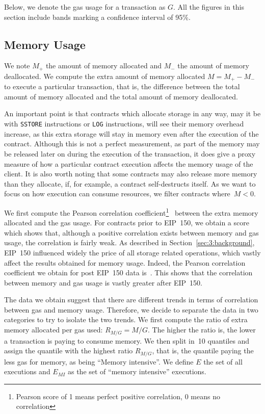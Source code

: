 Below, we denote the gas usage for a transaction as $G$. All the figures in this section include bands marking a confidence interval of 95\%.

\subsection{Memory Usage}
 We note $M_{+}$ the amount of memory allocated and $M_{-}$ the amount of memory deallocated. We compute the extra amount of memory allocated $M = M_{+} - M_{-}$ to execute a particular transaction, that is, the difference between the total amount of memory allocated and the total amount of memory deallocated.

An important point is that contracts which allocate storage in any way, may it be with \lstinline{SSTORE} instructions or \lstinline{LOG} instructions, will see their memory overhead increase, as this extra storage will stay in memory even after the execution of the contract. Although this is not a perfect measurement, as part of the memory may be released later on during the execution of the transaction, it does give a proxy measure of how a particular contract execution affects the memory usage of the client. It is also worth noting that some contracts may also release more memory than they allocate, if, for example, a contract self-destructs itself. As we want to focus on how execution can consume resources, we filter contracts where~$M < 0$.

We first compute the Pearson correlation coefficient\footnote{Pearson score of 1 means perfect positive correlation, 0 means no correlation}~\cite{boslaugh2012statistics} between the extra memory allocated and the gas usage. For contracts prior to  EIP~150, we obtain a score  which shows that, although a positive correlation exists between memory and gas usage, the correlation is fairly weak. As described in Section~\ref{sec:3:background}, EIP~150 influenced widely the price of all storage related operations, which vastly affect the results obtained for memory usage. Indeed, the Pearson correlation coefficient we obtain for post EIP~150 data is~. This shows that the correlation between memory and gas usage is vastly greater after EIP~150.

The data we obtain suggest that there are different trends in terms of correlation between gas and memory usage. Therefore, we decide to separate the data in two categories to try to isolate the two trends. We first compute the ratio of extra memory allocated per gas used: $R_{M/G} = M / G$. The higher the ratio is, the lower a transaction is paying to consume memory. We then split in~10 quantiles and assign the quantile with the highest ratio $R_{M/G}$, that is, the quantile paying the less gas for memory, as being ``Memory intensive''. We define $E$ the set of all executions and $E_{MI}$ as the set of ``memory intensive'' executions.

